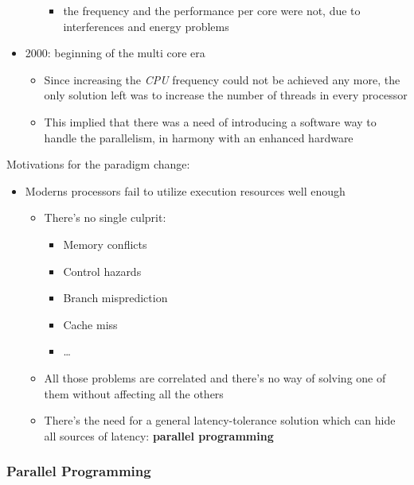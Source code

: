 \documentclass[english]{article}
\begin{document}
\begin{itemize}
\begin{itemize}
\begin{itemize}
                  \item[\xmark] the frequency and the performance per core were not, due to interferences and energy problems
                \end{itemize}
        \end{itemize}
  \item 2000: beginning of the multi core era
        \begin{itemize}
          \item Since increasing the \textit{CPU} frequency could not be achieved any more, the only solution left was to increase the number of threads in every processor
          \item This implied that there was a need of introducing a software way to handle the parallelism, in harmony with an enhanced hardware
        \end{itemize}
\end{itemize}

\bigskip
Motivations for the paradigm change:

\begin{itemize}
  \item Moderns processors fail to utilize execution resources well enough
        \begin{itemize}
          \item There's no single culprit:
                \begin{itemize}
                  \item Memory conflicts
                  \item Control hazards
                  \item Branch misprediction
                  \item Cache miss
                  \item \ldots
                \end{itemize}
          \item All those problems are correlated and there's no way of solving one of them without affecting all the others
          \item There's the need for a general latency-tolerance solution which can hide all sources of latency: \textbf{parallel programming}
        \end{itemize}
\end{itemize}

\subsubsection{Parallel Programming}
\end{document}
